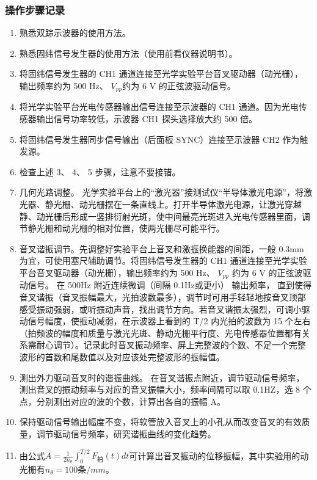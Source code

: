 \documentclass[dvipsnames, svgnames,a4paper,11pt]{article}
\begin{document}
	\subsubsection{操作步骤记录}
	\begin{enumerate}
		\item 熟悉双踪示波器的使用方法。
		\item 熟悉固纬信号发生器的使用方法（使用前看仪器说明书）。
		\item 将固纬信号发生器的 CH1 通道连接至光学实验平台音叉驱动器（动光栅）， 输出频率约为 500 Hz、 $V_{pp} $约为 6 V 的正弦波驱动信号。
		\item 将光学实验平台光电传感器输出信号连接至示波器的 CH1 通道。因为光电传感器输出信号功率较低，示波器 CH1 探头选择放大约 500 倍。
		\item 将固纬信号发生器同步信号输出（后面板 SYNC）连接至示波器 CH2 作为触发源。
		\item 检查上述 3、 4、 5 步骤，注意不要接错。
		\item 几何光路调整。 光学实验平台上的“激光器”接测试仪“半导体激光电源”，将激光器、静光栅、动光栅摆在一条直线上。打开半导体激光电源，让激光穿越静、动光栅后形成一竖排衍射光斑，使中间最亮光斑进入光电传感器里面，调节静光栅和动光栅的相对位置，使两光栅尽可能平行。
		\item 音叉谐振调节。先调整好实验平台上音叉和激振换能器的间距，一般 0.3mm 为宜，可使用塞尺辅助调节。将固纬信号发生器的 CH1 通道连接至光学实验平台音叉驱动器（动光栅），输出频率约为 500 Hz、 $V_{pp} $ 约为 6 V 的正弦波驱动信号。 在 500Hz 附近连续微调（间隔 0.1Hz或更小） 输出频率， 直到使得音叉谐振（音叉振幅最大，光拍波数最多），调节时可用手轻轻地按音叉顶部感受振动强弱，或听振动声音，找出调节方向。若音叉谐振太强烈，可调小驱动信号幅度，使振动减弱，在示波器上看到的 T/2 内光拍的波数为 15 个左右（拍频波的幅度和质量与激光光斑、静动光栅平行度、光电传感器位置都有关系需耐心调节）。记录此时音叉振动频率、屏上完整波的个数、不足一个完整波形的首数和尾数值以及对应该处完整波形的振幅值。
		\item 测出外力驱动音叉时的谐振曲线。 在音叉谐振点附近，调节驱动信号频率，测出音叉的振动频率与对应的音叉振幅大小，频率间隔可以取 0.1HZ，选 8 个点，分别测出对应的波的个数，计算出各自的振幅 A。
		\item 保持驱动信号输出幅度不变，将软管放入音叉上的小孔从而改变音叉的有效质量，调节驱动信号频率，研究谐振曲线的变化趋势。
		\item 由公式$ A =\frac{1}{2n_\theta} \int_0^{T/2} F_{拍}(t)  dt $可计算出音叉振动的位移振幅，其中实验用的动光栅有$n_\theta=100条/mm$。
	\end{enumerate}
	
\end{document}
